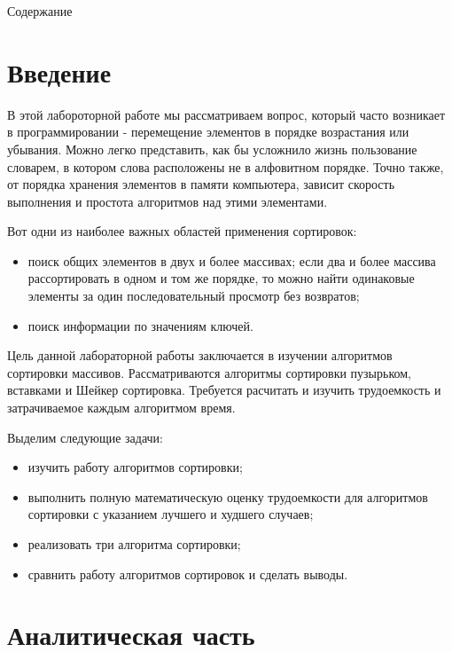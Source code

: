 \documentclass[12pt,a4paper]{report}
\renewcommand\contentsname{Содержание}
\begin{document}

\tableofcontents\contentsname

\newpage
\chapter*{Введение}
В этой лабороторной работе мы рассматриваем вопрос, который часто
 возникает в программировании - перемещение элементов в порядке
 возрастания или убывания. Можно легко представить, как бы усложнило 
 жизнь пользование словарем, в котором слова расположены не в
 алфовитном порядке. Точно также, от порядка хранения элементов в памяти
 компьютера, зависит скорость выполнения и простота
  алгоритмов над этими элементами.

 Вот одни из наиболее важных областей применения сортировок:


 \begin{itemize} 
     задач групперирования, когда нужно собрать 
    вместе все элементы с одинаковыми значениями некоторого признака;
    \item поиск общих элементов в двух и более массивах; 
    если два и более массива рассортировать в одном и том же порядке,
    то можно найти одинаковые элементы за один последовательный просмотр
    без возвратов; 
    \item поиск информации по значениям ключей. 
  \end{itemize}

Цель данной лабораторной работы заключается в изучении алгоритмов 
сортировки массивов. Рассматриваются алгоритмы сортировки пузырьком,
вставками и Шейкер сортировка. Требуется расчитать и изучить трудоемкость
и затрачиваемое каждым алгоритмом время.

Выделим следующие задачи:

\begin{itemize}
	\item изучить работу алгоритмов сортировки;
	\item выполнить полную математическую оценку трудоемкости
	для алгоритмов сортировки с указанием лучшего и худшего
	случаев;
	\item реализовать три алгоритма сортировки;
	\item сравнить работу алгоритмов сортировок и сделать выводы.
\end{itemize}
 
\newpage
\chapter{Аналитическая часть}
\end{document}
